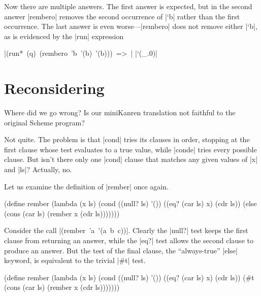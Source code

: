 \wspace

\noindent Now there are multiple answers.  The first answer is expected, but in
the second answer \mbox{\scheme|rembero|} removes the second
occurrence of \mbox{\scheme|`b|} rather than the first occurrence.  The
last answer is even worse---\mbox{\scheme|rembero|} does not remove
either \mbox{\scheme|`b|}, as is evidenced by the \mbox{\scheme|run|}
expression

\wspace

\noindent\mbox{\scheme|(run* (q) (rembero 'b '(b) '(b))) => |} \mbox{\schemeresult|`(_.0)|}

\section{Reconsidering {\rembersymbol}}\label{reconsiderrember}

Where did we go wrong?  Is our miniKanren translation not faithful to
the original Scheme program?

Not quite. The problem is that \mbox{\scheme|cond|} tries its clauses
in order, stopping at the first clause whose test evaluates to a true
value, while \mbox{\scheme|conde|} tries every possible clause.  But
isn't there only one \mbox{\scheme|cond|} clause that matches any
given values of \mbox{\scheme|x|} and \mbox{\scheme|ls|}?  Actually,
no.

Let us examine the definition of \mbox{\scheme|rember|} once again.

\schemedisplayspace
\begin{schemedisplay}
(define rember
  (lambda (x ls)
    (cond
      ((null? ls) '())
      ((eq? (car ls) x) (cdr ls))
      (else (cons (car ls) (rember x (cdr ls)))))))
\end{schemedisplay}

\noindent Consider the call \mbox{\scheme|(rember 'a '(a b c))|}.
Clearly the \mbox{\scheme|null?|} test keeps the first clause from
returning an answer, while the \mbox{\scheme|eq?|} test allows the
second clause to produce an answer.  But the test of the final clause,
the ``always-true'' \mbox{\scheme|else|} keyword, 
is equivalent to the trivial \mbox{\scheme|#t|} test.

\schemedisplayspace
\begin{schemedisplay}
(define rember
  (lambda (x ls)
    (cond
      ((null? ls) '())
      ((eq? (car ls) x) (cdr ls))
      (#t (cons (car ls) (rember x (cdr ls)))))))
\end{schemedisplay}

